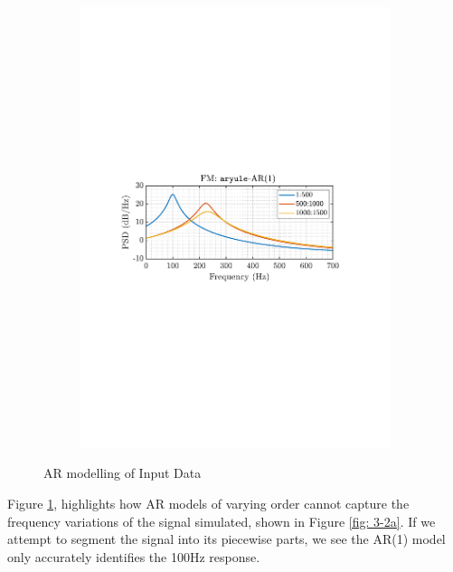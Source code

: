 \documentclass[12pt]{article}
\begin{document}
\begin{figure}[H]
\begin{subfigure}{0.49\textwidth}
					\includegraphics[trim={2.2cm 11.2cm 3.00cm  11.2cm}, clip, width=\textwidth]{../MATLAB/figures/q3_2a_fig04.pdf} 
					\captionsetup{justification=centering}
				\end{subfigure}
				
				\captionsetup{justification=centering}
				\caption{AR modelling of Input Data}
				\label{fig: 3-2a-AR-models}
			\end{figure}
			Figure \ref{fig: 3-2a-AR-models}, highlights how AR models of varying order cannot capture the frequency variations of the signal simulated, shown in Figure \ref{fig: 3-2a}. If we attempt to segment the signal into its piecewise parts, we see the AR(1) model only accurately identifies the 100Hz response.
			
\end{document}
